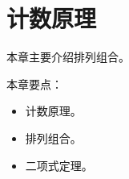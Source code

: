 \chapter{计数原理}

本章主要介绍排列组合。

本章要点：
\begin{itemize}
    \item 计数原理。
    \item 排列组合。
    \item 二项式定理。
\end{itemize}

\newpage


\newpage


\newpage


\newpage





